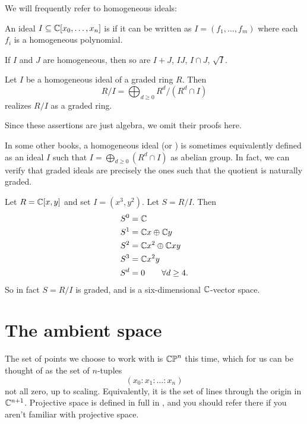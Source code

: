 We will frequently refer to homogeneous ideals:
\begin{definition}
	An ideal $I \subseteq \mathbb C[x_0, \dots, x_n]$ is 
	if it can be written as $I = (f_1, \dots, f_m)$
	where each $f_i$ is a homogeneous polynomial.
\end{definition}
\begin{remark}
	If $I$ and $J$ are homogeneous,
	then so are $I+J$, $IJ$, $I \cap J$, $\sqrt I$.
\end{remark}
\begin{lemma}
	Let $I$ be a homogeneous ideal of a graded ring $R$.
	Then
	\[ R/I = \bigoplus_{d \ge 0} R^d / (R^d \cap I) \]
	realizes $R/I$ as a graded ring.
\end{lemma}
Since these assertions are just algebra,
we omit their proofs here.
\begin{remark}
	In some other books, a homogeneous ideal (or ) is sometimes equivalently defined as an ideal $I$
	such that $I = \bigoplus_{d \ge 0} (R^d \cap I)$ as abelian group.
	In fact, we can verify that graded ideals are precisely the ones such that the quotient is naturally graded.
\end{remark}
\begin{example}
	Let $R = \mathbb C[x,y]$ and set $I = (x^3, y^2)$.
	Let $S = R/I$. Then
	\begin{align*}
		S^0 &= \mathbb C \\
		S^1 &= \mathbb C x \oplus \mathbb C y \\
		S^2 &= \mathbb C x^2 \oplus \mathbb C xy \\
		S^3 &= \mathbb C x^2y \\
		S^d &= 0 \qquad \forall d \ge 4.
	\end{align*}
	So in fact $S = R/I$ is graded,
	and is a six-dimensional $\mathbb C$-vector space.
\end{example}


\section{The ambient space}
The set of points we choose to work with is $\mathbb{CP}^n$ this time,
which for us can be thought of as the set of $n$-tuples
\[ \left( x_0 : x_1 : \dots : x_n \right) \]
not all zero, up to scaling.
Equivalently, it is the set of lines through the origin in $\mathbb C^{n+1}$.
Projective space is defined in full in ,
and you should refer there if you aren't familiar with projective space.

